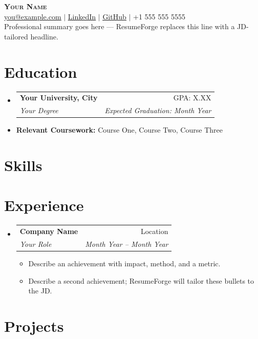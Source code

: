 \documentclass[letterpaper,10pt]{article}
\makeatletter
\newcommand{\resumeItem}[1]{
  \item{\small\setlength{\baselineskip}{10pt} #1 \vspace{-2pt}}
}
\newcommand{\resumeSubheading}[4]{
  \vspace{-2pt}\item
    \begin{tabular*}{\textwidth}[t]{@{}p{0.75\textwidth}@{\extracolsep{\fill}}r@{}}
      \textbf{#1} & \small #2 \\
      \textit{\small#3} & \textit{\small #4} \\
    \end{tabular*}\vspace{-4pt}
}
\newcommand{\resumeProjectHeading}[2]{
    \item
    \begin{tabular*}{\textwidth}{@{}l@{\extracolsep{\fill}}r@{}}
      \small#1 & \small\textit{#2} \\
    \end{tabular*}\vspace{-4pt}
}
\newcommand{\resumeSubHeadingListStart}{\begin{itemize}[leftmargin=0in, label={}, topsep=0pt, partopsep=0pt]}
\newcommand{\resumeSubHeadingListEnd}{\end{itemize}}
\newcommand{\resumeItemListStart}{\begin{itemize}[leftmargin=0.15in, label={\color{accent}$\bullet$}, topsep=0pt, partopsep=0pt, itemsep=3pt, parsep=0pt]}
\newcommand{\resumeItemListEnd}{\end{itemize}}
\makeatother
\begin{document}
\fontsize{10.5}{11}\selectfont
\begin{center}
    {\Huge \scshape \textbf{\color{accent}Your Name}} \\ \vspace{4pt}
    \href{mailto:you@example.com}{\ul{you@example.com}} $|$
    \href{https://www.linkedin.com/in/your-handle/}{\ul{LinkedIn}} $|$
    \href{https://github.com/your-handle}{\ul{GitHub}} $|$
    +1 555 555 5555 \\ \vspace{6pt}
    {Professional summary goes here — ResumeForge replaces this line with a JD-tailored headline.}
\end{center}
\section{Education}
\resumeSubHeadingListStart
  \resumeSubheading
    {Your University, City}{GPA: X.XX}
    {Your Degree}{\textit{Expected Graduation: Month Year}}  \vspace{-9pt}
  \item \small{\textbf{Relevant Coursework:} Course One, Course Two, Course Three}
\resumeSubHeadingListEnd
\section{Skills}
\begin{itemize}[leftmargin=0in, label={}, topsep=0pt, partopsep=0pt]
  \small{\item{
  }}
\end{itemize}
\section{Experience}
\resumeSubHeadingListStart
  \resumeSubheading
    {Company Name}{Location}
    {Your Role}{Month Year -- Month Year}
    \resumeItemListStart
      \resumeItem{Describe an achievement with impact, method, and a metric.}
      \resumeItem{Describe a second achievement; ResumeForge will tailor these bullets to the JD.}
    \resumeItemListEnd
\resumeSubHeadingListEnd
\section{Projects}
\resumeSubHeadingListStart
\resumeSubHeadingListEnd
\end{document}
